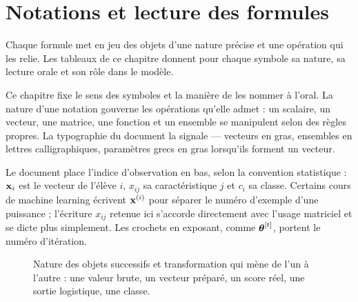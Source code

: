 \chapter{Notations et lecture des formules}
\label{ch:notations}

\begin{lecture}
Chaque formule met en jeu des objets d'une nature précise et une opération qui
les relie. Les tableaux de ce chapitre donnent pour chaque symbole sa nature, sa
lecture orale et son rôle dans le modèle.
\end{lecture}

Ce chapitre fixe le sens des symboles et la manière de les nommer à l'oral. La
nature d'une notation gouverne les opérations qu'elle admet : un scalaire, un
vecteur, une matrice, une fonction et un ensemble se manipulent selon des règles
propres. La typographie du document la signale — vecteurs en gras, ensembles en
lettres calligraphiques, paramètres grecs en gras lorsqu'ils forment un vecteur.

Le document place l'indice d'observation en bas, selon la convention statistique :
$\mathbf{x}_i$ est le vecteur de l'élève $i$, $x_{ij}$ sa caractéristique $j$ et $c_i$ sa
classe. Certains cours de machine learning écrivent $\mathbf{x}^{(i)}$ pour séparer le
numéro d'exemple d'une puissance ; l'écriture $x_{ij}$ retenue ici s'accorde
directement avec l'usage matriciel et se dicte plus simplement. Les crochets en
exposant, comme $\boldsymbol{\theta}^{[t]}$, portent le numéro d'itération.

\begin{figure}[htbp]
\centering
{}
\caption{Nature des objets successifs et transformation qui mène de l'un à
l'autre : une valeur brute, un vecteur préparé, un score réel, une sortie
logistique, une classe.}
\label{fig:notation-chain}
\end{figure}

